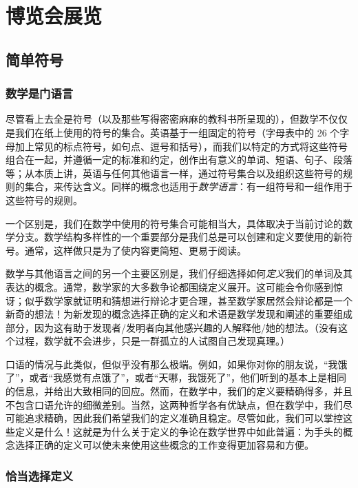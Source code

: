\section{博览会展览}\label{sec:section1.2}

\subsection{简单符号}

\subsubsection*{数学是门语言}

尽管看上去全是符号（以及那些写得密密麻麻的教科书所呈现的），但数学不仅仅是我们在纸上使用的符号的集合。英语基于一组固定的符号（字母表中的 26 个字母加上常见的标点符号，如句点、逗号和括号），而我们以特定的方式将这些符号组合在一起，并遵循一定的标准和约定，创作出有意义的单词、短语、句子、段落等；从本质上讲，英语与任何其他语言一样，通过符号集合以及组织这些符号的规则的集合，来传达含义。同样的概念也适用于\textit{数学语言}：有一组符号和一组作用于这些符号的规则。

一个区别是，我们在数学中使用的符号集合可能相当大，具体取决于当前讨论的数学分支。数学结构多样性的一个重要部分是我们总是可以创建和定义要使用的新符号。通常，这样做只是为了使内容更简短、更易于阅读。

数学与其他语言之间的另一个主要区别是，我们仔细选择如何\textit{定义}我们的单词及其表达的概念。通常，数学家的大多数争论都围绕定义展开。这可能会令你感到惊讶；似乎数学家就证明和猜想进行辩论才更合理，甚至数学家居然会辩论都是一个新奇的想法！为新发现的概念选择正确的定义和术语是数学发现和阐述的重要组成部分，因为这有助于发现者/发明者向其他感兴趣的人解释他/她的想法。（没有这个过程，数学就不会进步，只是一群孤立的人试图自己发现真理。）

口语的情况与此类似，但似乎没有那么极端。例如，如果你对你的朋友说，“我饿了”，或者“我感觉有点饿了”，或者“天哪，我饿死了”，他们听到的基本上是相同的信息，并给出大致相同的回应。然而，在数学中，我们的定义要精确得多，并且不包含口语允许的细微差别。当然，这两种哲学各有优缺点，但在数学中，我们尽可能追求精确，因此我们希望我们的定义准确且稳定。尽管如此，我们可以掌控这些定义是什么！这就是为什么关于定义的争论在数学世界中如此普遍：为手头的概念选择正确的定义可以使未来使用这些概念的工作变得更加容易和方便。

\subsubsection*{恰当选择定义}

